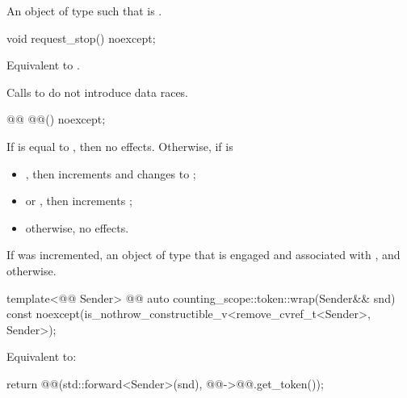 \begin{itemdescr}
\pnum
\returns
An object  of type  such that
 is .
\end{itemdescr}

%
\begin{itemdecl}
void request_stop() noexcept;
\end{itemdecl}

\begin{itemdescr}
\pnum
\effects
Equivalent to .

\pnum
\remarks
Calls to  do not introduce data races.
\end{itemdescr}

%
\begin{itemdecl}
@@ @@() noexcept;
\end{itemdecl}

\begin{itemdescr}
\pnum
\effects
If  is equal to ,
then no effects.
Otherwise, if  is
\begin{itemize}
\item
{}, then increments  and
changes  to ;
\item
{} or , then increments ;
\item
otherwise, no effects.
\end{itemize}

\pnum
\returns
If  was incremented,
an object of type 
that is engaged and associated with , and
 otherwise.
\end{itemdescr}

%
\begin{itemdecl}
template<@@ Sender>
  @@ auto counting_scope::token::wrap(Sender&& snd) const
    noexcept(is_nothrow_constructible_v<remove_cvref_t<Sender>, Sender>);
\end{itemdecl}

\begin{itemdescr}
\pnum
\effects
Equivalent to:
\begin{codeblock}
return @@(std::forward<Sender>(snd), @@->@@.get_token());
\end{codeblock}
\end{itemdescr}

